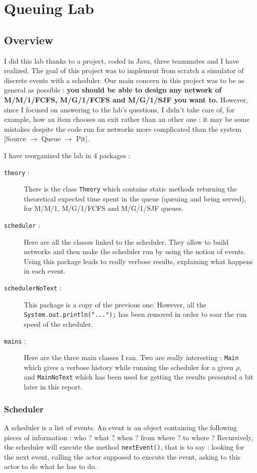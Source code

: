 \documentclass[a4paper]{report}
\begin{document}
\section*{Queuing Lab}
\subsection*{Overview}
I did this lab thanks to a project, coded in Java, three teammates and I have realized. The goal of this project was to implement from scratch a simulator of discrete events with a scheduler. Our main concern in this project was to be as general as possible : \textbf{you should be able to design any network of M/M/1/FCFS, M/G/1/FCFS and M/G/1/SJF you want to.} However, since I focused on answering to the lab's questions, I didn't take care of, for example, how an item chooses an exit rather than an other one : it may be some mistakes despite the code run for networks more complicated than the system [Source $\rightarrow$ Queue $\rightarrow$ Pit].
\par
I have reorganized the lab in 4 packages : 
\begin{description}
\item[\texttt{theory} :] There is the class \texttt{Theory} which contains static methods returning the theoretical expected time spent in the queue (queuing and being served), for M/M/1, M/G/1/FCFS and M/G/1/SJF queues.

\item[\texttt{scheduler} :] Here are all the classes linked to the scheduler. They allow to build networks and then make the scheduler run by using the notion of events. Using this package leads to really verbose results, explaining what happens in each event.

\item[\texttt{schedulerNoText} :] This package is a copy of the previous one. However, all the \texttt{System.out.println("...");} has been removed in order to soar the run speed of the scheduler.

\item[\texttt{mains} :] Here are the three main classes I ran. Two are really interesting : \texttt{Main} which gives a verbose history while running the scheduler for a given $\rho$, and \texttt{MainNoText} which has been used for getting the results presented a bit later in this report.
\end{description}
\subsubsection{Scheduler}
A scheduler is a list of events. An event is an object containing the following pieces of information : who ? what ? when ? from where ? to where ? Recursively, the scheduler will execute the method \texttt{nextEvent()}, that is to say : looking for the next event, calling the actor supposed to execute the event, asking to this actor to do what he has to do.
\end{document}

